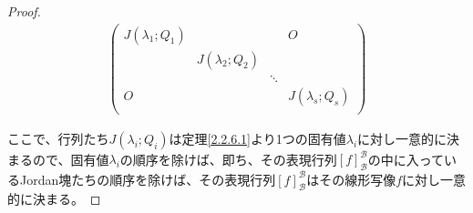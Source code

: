 \documentclass[dvipdfmx]{jsarticle}
\begin{document}
\begin{proof}
\begin{align*}
\begin{pmatrix}
J\left( \lambda_{1};Q_{1} \right) & \  & \  & O \\
\  & J\left( \lambda_{2};Q_{2} \right) & \  & \  \\
\  & \  & \ddots & \  \\
O & \  & \  & J\left( \lambda_{s};Q_{s} \right) \\
\end{pmatrix}
\end{align*}\par
ここで、行列たち$J\left( \lambda_{i};Q_{i} \right)$は定理\ref{2.2.6.1}より1つの固有値$\lambda_{i}$に対し一意的に決まるので、固有値$\lambda_{i}$の順序を除けば、即ち、その表現行列$[ f]_{\mathcal{B}}^{\mathcal{B}}$の中に入っているJordan塊たちの順序を除けば、その表現行列$[ f]_{\mathcal{B}}^{\mathcal{B}}$はその線形写像$f$に対し一意的に決まる。
\end{proof}
\end{document}
